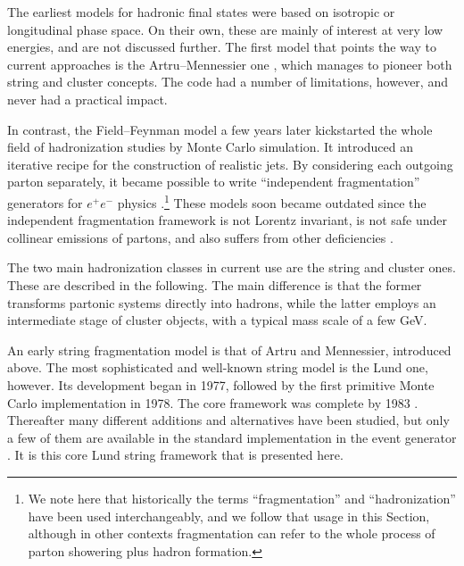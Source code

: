 The earliest models for hadronic final states were based 
on isotropic or longitudinal phase space. On their own, these are 
mainly of interest at very low energies, and are not discussed 
further. The first model that points the way to current approaches 
is the Artru--Mennessier one \cite{Artru:1974hr}, which manages to 
pioneer both string and cluster concepts. The code had a 
number of limitations, however, and never had a practical impact.

In contrast, the Field--Feynman model \cite{Field:1977fa} 
a few years later kickstarted the whole field of hadronization
studies by Monte Carlo simulation. It introduced an iterative 
recipe for the construction of realistic jets. By considering each
outgoing parton separately, it became possible to write 
``independent fragmentation'' generators for $e^+e^-$ physics 
\cite{Hoyer:1979ta,Ali:1979em}.\footnote{We note here that historically the terms
  ``fragmentation'' and ``hadronization'' have been used
  interchangeably, and we follow that usage in this Section, although in other
  contexts fragmentation can refer to the whole process of parton
  showering plus hadron formation.} These models soon became outdated
since the independent fragmentation framework is not Lorentz invariant, 
is not safe under collinear emissions of partons, and also suffers 
from other deficiencies \cite{Sjostrand:1984iy}.

The two main hadronization classes in current use are the string 
and cluster ones. These are described in the following. The main 
difference is that the former transforms partonic systems
directly into hadrons, while the latter employs an intermediate 
stage of cluster objects, with a typical mass scale of a few GeV.

\label{sec:string-model}

An early string fragmentation model is that of Artru and Mennessier, 
introduced above. The most sophisticated and well-known string 
model is the Lund one, however. Its development began in 1977,  
followed by the first primitive Monte Carlo implementation in 1978. 
The core framework was complete by 1983 \cite{Andersson:1983ia,%
Andersson:1998tv}. Thereafter many different additions and 
alternatives have been studied, but only 
a few of them are available in the standard implementation in the 
\pythia event generator \cite{Sjostrand:2006za,Sjostrand:2007gs}.
It is this core Lund string framework that is presented here.  

